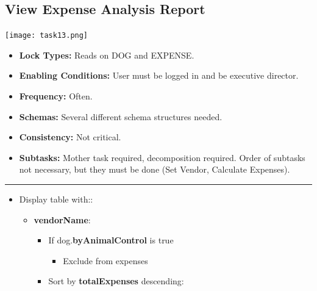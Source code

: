 \documentclass{article}
\begin{document}
\subsection{View Expense Analysis Report}
\begin{center}
    \texttt{[image: task13.png]}
\end{center}
\begin{itemize}
    \item \textbf{Lock Types:} Reads on DOG and EXPENSE.
    \item \textbf{Enabling Conditions:} User must be logged in and be executive director.
    \item \textbf{Frequency:} Often.
    \item \textbf{Schemas:} Several different schema structures needed.
    \item \textbf{Consistency:} Not critical.
    \item \textbf{Subtasks:} Mother task required, decomposition required. Order of subtasks not necessary, but they must be done (Set Vendor, Calculate Expenses).
\end{itemize}
\noindent\rule{8cm}{0.4pt}
\begin{itemize}
\item Display table with::
\begin{itemize}
    \item \textbf{vendorName}:
    \begin{itemize}
        \item If dog.\textbf{byAnimalControl} is true
        \begin{itemize}
            \item Exclude from expenses
        \end{itemize}
        \item Sort by \textbf{totalExpenses} descending:
    \end{itemize}
\end{itemize}        
\end{itemize}   
\end{document}
